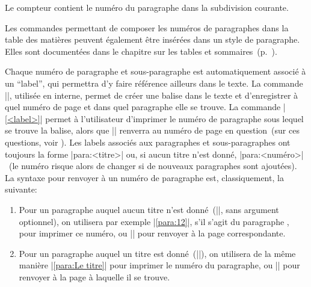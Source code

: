 \begin{developer}
Le compteur  contient le numéro du paragraphe dans la subdivision courante.
\end{developer}

\begin{noprint}
\setcounter{precis}{0}
\end{noprint}

Les commandes permettant de composer les numéros de paragraphes dans la table des matières peuvent également être insérées dans un style de paragraphe. Elles sont documentées dans le chapitre sur les tables et sommaires~(p.~\pageref{tables-of-contents}).

Chaque numéro de paragraphe et sous-paragraphe est automatiquement associé à un \enquote{label}, qui permettra d'y faire référence ailleurs dans le texte. La commande |\label{<label>}|, utilisée en interne, permet de créer une balise dans le texte et d'enregistrer à quel numéro de page et dans quel paragraphe elle se trouve. La commande |\ref{<label>}| permet à l'utilisateur d'imprimer le numéro de paragraphe sous lequel se trouve la balise, alors que |\pageref{<label>}| renverra au numéro de page en question~(sur ces questions, voir ). Les labels associés aux paragraphes et sous-paragraphes ont toujours la forme |para:<titre>| ou, si aucun titre n'est donné, |para:<numéro>|~(le numéro risque alors de changer si de nouveaux paragraphes sont ajoutées). La syntaxe pour renvoyer à un numéro de paragraphe est, classiquement, la suivante:
\begin{enumerate}
\item Pour un paragraphe auquel aucun titre n'est donné~(|\para|, sans argument optionnel), on utilisera par exemple |\ref{para:12}|, s'il s'agit du paragraphe , pour imprimer ce numéro, ou |\pageref{para:12}| pour renvoyer à la page correspondante.
\item Pour un paragraphe auquel un titre est donné~(|\para[Le titre]|), on utilisera de la même manière |\ref{para:Le titre}| pour imprimer le numéro du paragraphe, ou |\pageref{para:Le titre}| pour renvoyer à la page à laquelle il se trouve.
\end{enumerate}

